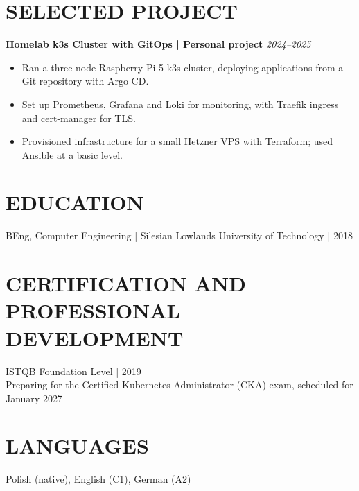 \documentclass[11pt,a4paper]{article}
\begin{document}
\section*{SELECTED PROJECT}
\textbf{Homelab k3s Cluster with GitOps | Personal project} \hfill \textit{2024--2025}
\begin{itemize}
\item Ran a three-node Raspberry Pi 5 k3s cluster, deploying applications from a Git repository with Argo CD.
\item Set up Prometheus, Grafana and Loki for monitoring, with Traefik ingress and cert-manager for TLS.
\item Provisioned infrastructure for a small Hetzner VPS with Terraform; used Ansible at a basic level.
\end{itemize}

\section*{EDUCATION}
BEng, Computer Engineering | Silesian Lowlands University of Technology | 2018

\section*{CERTIFICATION AND PROFESSIONAL DEVELOPMENT}
ISTQB Foundation Level | 2019\\
Preparing for the Certified Kubernetes Administrator (CKA) exam, scheduled for January 2027

\section*{LANGUAGES}
Polish (native), English (C1), German (A2)
\end{document}
